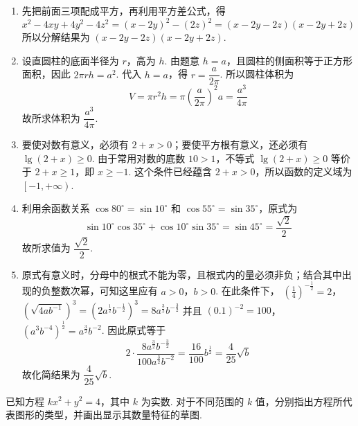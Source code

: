 \begin{solution}
\begin{enumerate}
\item 先把前面三项配成平方，再利用平方差公式，得
\[
x^{2}-4xy+4y^{2}-4z^{2}=(x-2y)^{2}-(2z)^{2}=(x-2y-2z)(x-2y+2z)
\]
所以分解结果为 \((x-2y-2z)(x-2y+2z)\).

\item 设直圆柱的底面半径为 \(r\)，高为 \(h\). 由题意 \(h=a\)，且圆柱的侧面积等于正方形面积，因此 \(2\pi rh=a^{2}\). 代入 \(h=a\)，得 \(r=\dfrac{a}{2\pi}\). 所以圆柱体积为
\[
V=\pi r^{2}h=\pi\left(\frac{a}{2\pi}\right)^{2}a=\frac{a^{3}}{4\pi}
\]
故所求体积为 \(\dfrac{a^{3}}{4\pi}\).

\item 要使对数有意义，必须有 \(2+x>0\)；要使平方根有意义，还必须有 \(\lg(2+x)\geqslant0\). 由于常用对数的底数 \(10>1\)，不等式 \(\lg(2+x)\geqslant0\) 等价于 \(2+x\geqslant1\)，即 \(x\geqslant-1\). 这个条件已经蕴含 \(2+x>0\)，所以函数的定义域为 \(\left[-1,+\infty\right)\).

\item 利用余函数关系 \(\cos80^{\circ}=\sin10^{\circ}\) 和 \(\cos55^{\circ}=\sin35^{\circ}\)，原式为
\[
\sin10^{\circ}\cos35^{\circ}+\cos10^{\circ}\sin35^{\circ}=\sin45^{\circ}=\frac{\sqrt{2}}{2}
\]
故所求值为 \(\dfrac{\sqrt{2}}{2}\).

\item 原式有意义时，分母中的根式不能为零，且根式内的量必须非负；结合其中出现的负整数次幂，可知这里应有 \(a>0\)，\(b>0\). 在此条件下，
\(\left(\frac{1}{4}\right)^{-\frac{1}{2}}=2\)，\(\left(\sqrt{4ab^{-1}}\right)^{3}=\left(2a^{\frac{1}{2}}b^{-\frac{1}{2}}\right)^{3}=8a^{\frac{3}{2}}b^{-\frac{3}{2}}\)
并且
\((0.1)^{-2}=100\)，\(\left(a^{3}b^{-4}\right)^{\frac{1}{2}}=a^{\frac{3}{2}}b^{-2}\).
因此原式等于
\[
2\cdot\frac{8a^{\frac{3}{2}}b^{-\frac{3}{2}}}{100a^{\frac{3}{2}}b^{-2}}
=\frac{16}{100}b^{\frac{1}{2}}
=\frac{4}{25}\sqrt{b}
\]
故化简结果为 \(\dfrac{4}{25}\sqrt{b}\).
\end{enumerate}
\end{solution}

\begin{problem}
已知方程 \(kx^{2}+y^{2}=4\)，其中 \(k\) 为实数. 对于不同范围的 \(k\) 值，分别指出方程所代表图形的类型，并画出显示其数量特征的草图.
\end{problem}

